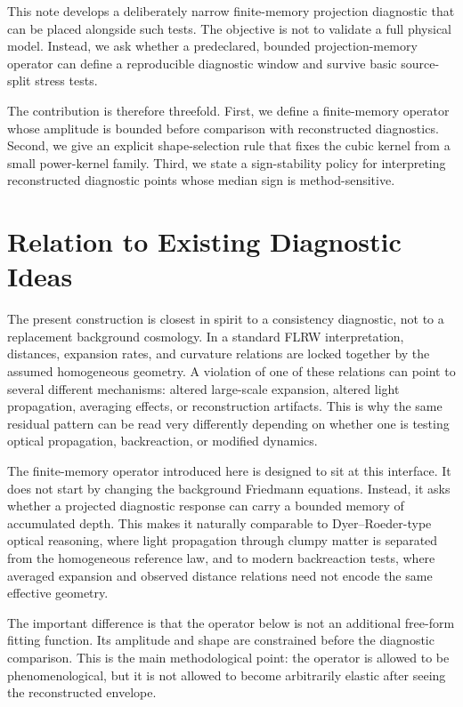 \documentclass[11pt]{article}
\begin{document}
This note develops a deliberately narrow finite-memory projection diagnostic
that can be placed alongside such tests. The objective is not to validate a full
physical model. Instead, we ask whether a predeclared, bounded
projection-memory operator can define a reproducible diagnostic window and
survive basic source-split stress tests.

The contribution is therefore threefold. First, we define a finite-memory
operator whose amplitude is bounded before comparison with reconstructed
diagnostics. Second, we give an explicit shape-selection rule that fixes the
cubic kernel from a small power-kernel family. Third, we state a sign-stability
policy for interpreting reconstructed diagnostic points whose median sign is
method-sensitive.

\section{Relation to Existing Diagnostic Ideas}

The present construction is closest in spirit to a consistency diagnostic, not
to a replacement background cosmology. In a standard FLRW interpretation,
distances, expansion rates, and curvature relations are locked together by the
assumed homogeneous geometry. A violation of one of these relations can point
to several different mechanisms: altered large-scale expansion, altered light
propagation, averaging effects, or reconstruction artifacts. This is why the
same residual pattern can be read very differently depending on whether one is
testing optical propagation, backreaction, or modified dynamics.

The finite-memory operator introduced here is designed to sit at this
interface. It does not start by changing the background Friedmann equations.
Instead, it asks whether a projected diagnostic response can carry a bounded
memory of accumulated depth. This makes it naturally comparable to
Dyer--Roeder-type optical reasoning, where light propagation through clumpy
matter is separated from the homogeneous reference law, and to modern
backreaction tests, where averaged expansion and observed distance relations
need not encode the same effective geometry.

The important difference is that the operator below is not an additional
free-form fitting function. Its amplitude and shape are constrained before the
diagnostic comparison. This is the main methodological point: the operator is
allowed to be phenomenological, but it is not allowed to become arbitrarily
elastic after seeing the reconstructed envelope.
\end{document}
